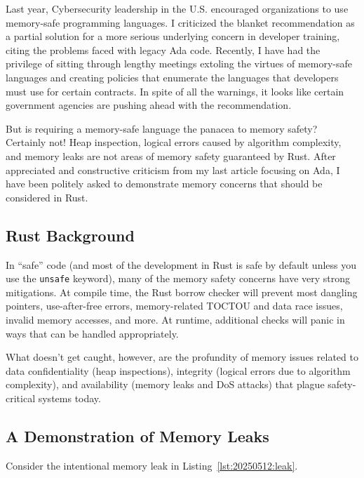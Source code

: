 Last year, Cybersecurity leadership in the U.S. encouraged organizations to use memory-safe programming languages. I criticized the blanket recommendation\autocite{20250512:hood2} as a partial solution for a more serious underlying concern in developer training, citing the problems faced with legacy Ada code\autocite{20250512:hood}. Recently, I have had the privilege of sitting through lengthy meetings extoling the virtues of memory-safe languages and creating policies that enumerate the languages that developers must use for certain contracts. In spite of all the warnings, it looks like certain government agencies are pushing ahead with the recommendation.

But is requiring a memory-safe language the panacea to memory safety? Certainly not! Heap inspection, logical errors caused by algorithm complexity, and memory leaks are not areas of memory safety guaranteed by Rust. After appreciated and constructive criticism from my last article focusing on Ada, I have been politely asked to demonstrate memory concerns that should be considered in Rust.

\subsection*{Rust Background}
In ``safe'' code (and most of the development in Rust is safe by default unless you use the \texttt{unsafe} keyword), many of the memory safety concerns have very strong mitigations. At compile time, the Rust borrow checker will prevent most dangling pointers, use-after-free errors, memory-related TOCTOU and data race issues, invalid memory accesses, and more. At runtime, additional checks will panic in ways that can be handled appropriately.

What doesn't get caught, however, are the profundity of memory issues related to data confidentiality (heap inspections), integrity (logical errors due to algorithm complexity), and availability (memory leaks and DoS attacks) that plague safety-critical systems today.

\subsection*{A Demonstration of Memory Leaks}

Consider the intentional memory leak in Listing~\ref{lst:20250512:leak}.

